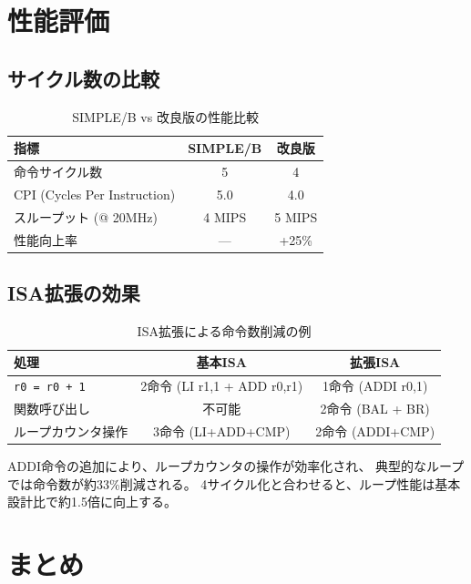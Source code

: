 \documentclass[a4paper,11pt]{ltjsarticle}
\begin{document}
\section{性能評価}

\subsection{サイクル数の比較}

\begin{table}[h]
\centering
\caption{SIMPLE/B vs 改良版の性能比較}
\begin{tabular}{lcc}
\toprule
指標 & SIMPLE/B & 改良版 \\
\midrule
命令サイクル数 & 5 & 4 \\
CPI (Cycles Per Instruction) & 5.0 & 4.0 \\
スループット (@ 20MHz) & 4 MIPS & 5 MIPS \\
性能向上率 & --- & +25\% \\
\bottomrule
\end{tabular}
\end{table}

\subsection{ISA拡張の効果}

\begin{table}[h]
\centering
\caption{ISA拡張による命令数削減の例}
\begin{tabular}{lcc}
\toprule
処理 & 基本ISA & 拡張ISA \\
\midrule
\texttt{r0 = r0 + 1} & 2命令 (LI r1,1 + ADD r0,r1) & 1命令 (ADDI r0,1) \\
関数呼び出し & 不可能 & 2命令 (BAL + BR) \\
ループカウンタ操作 & 3命令 (LI+ADD+CMP) & 2命令 (ADDI+CMP) \\
\bottomrule
\end{tabular}
\end{table}

ADDI命令の追加により、ループカウンタの操作が効率化され、
典型的なループでは命令数が約33\%削減される。
4サイクル化と合わせると、ループ性能は基本設計比で約1.5倍に向上する。


\section{まとめ}
\end{document}
